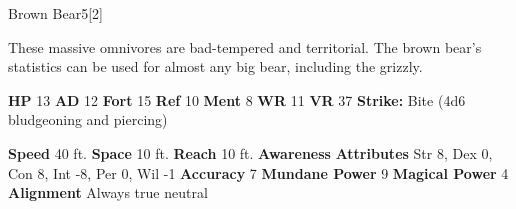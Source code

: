   
  \begin{monsection}{Brown Bear}{5}[2]
    \vspace{-1em}\vspace{-1em}
    \vspace{0em}

    
      These massive omnivores are bad-tempered and territorial.
      The brown bear's statistics can be used for almost any big bear, including the grizzly.
    
    

    \begin{spellcontent}
      \begin{spelltargetinginfo}
        \pari \textbf{HP} 13 \monsep
          \textbf{AD} 12 \monsep
          \textbf{Fort} 15 \monsep
          \textbf{Ref} 10 \monsep
          \textbf{Ment} 8
        \pari \textbf{WR} 11 \monsep
        \textbf{VR} 37
        \pari \textbf{Strike:}
            Bite  (4d6 bludgeoning and piercing)
      \end{spelltargetinginfo}
    \end{spellcontent}
    \begin{monsterfooter}
      \pari \textbf{Speed} 40 ft. \monsep
        \textbf{Space} 10 ft. \monsep
        \textbf{Reach} 10 ft.
      \pari \textbf{Awareness} 
      \pari \textbf{Attributes}
        Str 8, Dex 0,
        Con 8, Int -8,
        Per 0, Wil -1
      \pari \textbf{Accuracy} 7 \monsep
        \textbf{Mundane Power} 9 \monsep
      \textbf{Magical Power} 4
      \pari \textbf{Alignment} Always true neutral
    \end{monsterfooter}
  \end{monsection}
  
